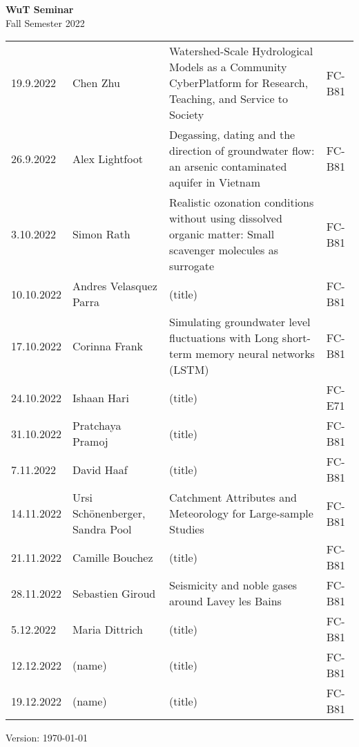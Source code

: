 \documentclass[12pt]{article}
\begin{document}
\centering

{\Huge \bf WuT Seminar}\\[1cm]
{\Large Fall Semester 2022}\\[1.8cm]





\renewcommand*\arraystretch{1.4}
\begin{tabular}{l p{3.8cm} p{8.5cm} p{2cm}}

19.9.2022
 	& Chen Zhu
 	& Watershed-Scale Hydrological Models as a Community CyberPlatform for Research, Teaching, and Service to Society
  & FC-B81\\
  
26.9.2022
 	& Alex Lightfoot
 	& Degassing, dating and the direction of groundwater flow: an arsenic contaminated aquifer in Vietnam
 	& FC-B81\\

3.10.2022
 	& Simon Rath
 	& Realistic ozonation conditions without using dissolved organic matter: Small scavenger molecules as surrogate
 	& FC-B81\\

10.10.2022
 	& Andres Velasquez Parra
 	& (title)
 	& FC-B81\\

17.10.2022  
 	& Corinna Frank
 	& Simulating groundwater level fluctuations with Long short-term memory neural networks (LSTM)
 	& FC-B81\\
 	
24.10.2022
 	& Ishaan Hari
 	& (title)
 	& FC-E71\\

31.10.2022
 	& Pratchaya Pramoj
 	& (title)
 	& FC-B81\\

7.11.2022
 	& David Haaf
 	& (title)
 	& FC-B81\\

14.11.2022
 	& Ursi Schönenberger, Sandra Pool
 	& Catchment Attributes and Meteorology for Large-sample Studies
 	& FC-B81\\

21.11.2022
 	& Camille Bouchez
 	& (title)
 	& FC-B81\\

28.11.2022
 	& Sebastien Giroud
 	& Seismicity and noble gases around Lavey les Bains
 	& FC-B81\\

5.12.2022
 	& Maria Dittrich
 	& (title)
 	& FC-B81\\

12.12.2022
 	& (name)
 	& (title)
 	& FC-B81\\

19.12.2022
 	& (name)
 	& (title)
 	& FC-B81\\


\end{tabular}

\vfill

{\scriptsize Version: \today}
\end{document}
